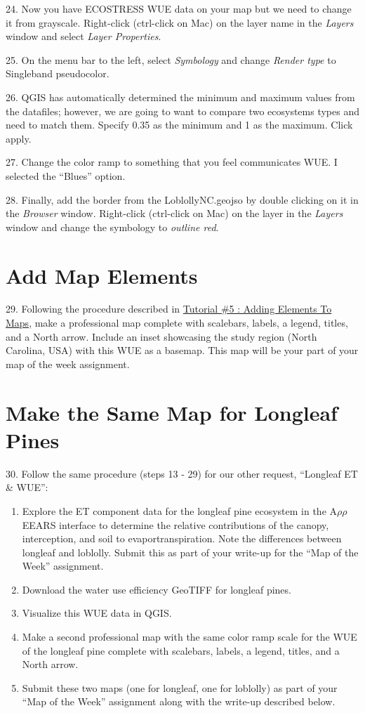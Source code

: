 \documentclass[oneside,a4paper,11pt,explicit]{book}
\begin{document}
24. Now you have ECOSTRESS WUE data on your map but we need to change it from grayscale. Right-click (ctrl-click on Mac) on the layer name in the \textit{Layers} window and select \textit{Layer Properties}. 

25. On the menu bar to the left, select \textit{Symbology} and change \textit{Render type} to Singleband pseudocolor. 

26. QGIS has automatically determined the minimum and maximum values from the datafiles; however, we are going to want to compare two ecosystems types and need to match them. Specify 0.35 as the minimum and 1 as the maximum. Click apply.

27. Change the color ramp to something that you feel communicates WUE. I selected the ``Blues'' option.

28. Finally, add the border from the LoblollyNC.geojso by double clicking on it in the \textit{Browser} window. Right-click (ctrl-click on Mac) on the layer in the \textit{Layers} window and change the symbology to \textit{outline red}. 


\section{Add Map Elements}

29. Following the procedure described in \href{https://jeremydforsythe.github.io/icecream-tutorials/Tutorial5_AddingElementsToMaps/Tutorial5_AddingElementsToMaps.pdf}{Tutorial \#5 : Adding Elements To Maps}, make a professional map complete with scalebars, labels, a legend, titles, and a North arrow. Include an inset showcasing the study region (North Carolina, USA) with this WUE as a basemap. This map will be your part of your map of the week assignment.

\section{Make the Same Map for Longleaf Pines}

30. Follow the same procedure (steps 13 - 29) for our other request, ``Longleaf ET \& WUE'':

\begin{enumerate}
	\item Explore the ET component data for the longleaf pine ecosystem in the A$\rho\rho$EEARS interface to determine the relative contributions of the canopy, interception, and soil to evaportranspiration. Note the differences between longleaf and loblolly. Submit this as part of your write-up for the ``Map of the Week'' assignment.
	\item Download the water use efficiency GeoTIFF for longleaf pines.
	\item Visualize this WUE data in QGIS.
	\item Make a second professional map with the same color ramp scale for the WUE of the longleaf pine complete with scalebars, labels, a legend, titles, and a North arrow.
	\item Submit these two maps (one for longleaf, one for loblolly) as part of your ``Map of the Week'' assignment along with the write-up described below.
\end{enumerate}
\end{document}
